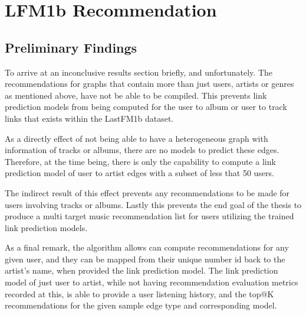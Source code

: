 \section{LFM1b Recommendation}


\subsection{Preliminary Findings}

To arrive at an inconclusive results section briefly, and unfortunately. The recommendations for graphs that contain more than just users, artists or genres as mentioned above, have not be able to be compiled. This prevents link prediction models from being computed for the user to album or user to track links that exists within the LastFM1b dataset.

As a directly effect of not being able to have a heterogeneous graph with information of tracks or albums, there are no models to predict these edges. Therefore, at the time being, there is only the capability to compute a link prediction model of user to artist edges with a subset of less that 50 users.

The indirect result of this effect prevents any recommendations to be made for users involving tracks or albums. Lastly this prevents the end goal of the thesis to produce a multi target music recommendation list for users utilizing the trained link prediction models.

As a final remark, the algorithm allows can compute recommendations for any given user, and they can be mapped from their unique number id back to the artist’s name, when provided the link prediction model. The link prediction model of just user to artist, while not having recommendation evaluation metrics recorded at this, is able to provide a user listening history, and the top@K recommendations for the given sample edge type and corresponding model.

